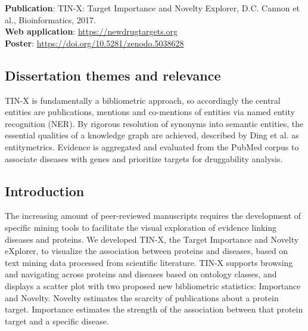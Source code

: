 \textbf{Publication}: TIN-X: Target Importance and Novelty Explorer, D.C. Cannon et al., Bioinformatics, 2017\cite{Cannon2017-af}.\\
\textbf{Web application}: \href{https://newdrugtargets.org}{https://newdrugtargets.org}\\
\textbf{Poster}: \href{https://doi.org/10.5281/zenodo.5038628}{https://doi.org/10.5281/zenodo.5038628}

\subsection{Dissertation themes and relevance}

TIN-X is fundamentally a bibliometric approach, so accordingly the
central entities are publications, mentions and co-mentions of entities
via named entity recognition (NER). By rigorous resolution of synonyms
into semantic entities, the essential qualities of a knowledge graph
are achieved, described by Ding et al. as
entitymetrics\cite{Ding2013-ua,Yu2021-ti}. Evidence is aggregated and
evaluated from the PubMed corpus to associate diseases with genes and
prioritize targets for druggability analysis.

\subsection{Introduction}

The increasing amount of peer-reviewed manuscripts requires the development of specific mining tools to facilitate the visual exploration of evidence linking diseases and proteins. We developed TIN-X, the Target Importance and Novelty eXplorer, to visualize the association between proteins and diseases, based on text mining data processed from scientific literature. TIN-X supports browsing and navigating across proteins and diseases based on ontology classes, and displays a scatter plot with two proposed new bibliometric statistics: Importance and Novelty. Novelty estimates the scarcity of publications about a protein target. Importance estimates the strength of the association between that protein target and a specific disease.

